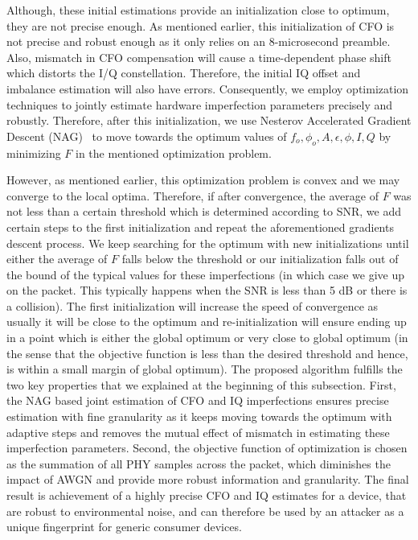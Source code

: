 Although, these initial estimations provide an initialization close to optimum, they are not precise enough. As mentioned earlier, this initialization of CFO is not precise and robust enough as it only relies on an 8-microsecond preamble. Also, mismatch in CFO compensation will cause a time-dependent phase shift which distorts the I/Q constellation. Therefore, the initial IQ offset and imbalance estimation will also have errors. Consequently, we employ optimization techniques to jointly estimate hardware imperfection parameters precisely and robustly. Therefore, after this initialization, we use Nesterov Accelerated Gradient Descent (NAG)~\cite{?} to move towards the optimum values of $f_o,\phi_o,A,\epsilon,\phi,I,Q$ by minimizing $F$ in the mentioned optimization problem.

However, as mentioned earlier, this optimization problem is convex and we may converge to the local optima. Therefore, if after convergence, the average of $F$ was not less than a certain threshold which is determined according to SNR, we add certain steps to the first initialization and repeat the aforementioned gradients descent process. We keep searching for the optimum with new initializations until either the average of $F$ falls below the threshold or our initialization falls out of the bound of the typical values for these imperfections (in which case we give up on the packet. This typically happens when the SNR is less than 5 dB or there is a collision). The first initialization will increase the speed of convergence as usually it will be close to the optimum and re-initialization will ensure ending up in a point which is either the global optimum or very close to global optimum (in the sense that the objective function is less than the desired threshold and hence, is within a small margin of global optimum). The proposed algorithm fulfills the two key properties that we explained at the beginning of this subsection. First, the NAG based joint estimation of CFO and IQ imperfections ensures precise estimation with fine granularity as it keeps moving towards the optimum with adaptive steps and removes the mutual effect of mismatch in estimating these imperfection parameters. Second, the objective function of optimization is chosen as the summation of all PHY samples across the packet, which diminishes the impact of AWGN and provide more robust information and granularity. The final result is achievement of a highly precise CFO and IQ estimates for a device, that are robust to environmental noise, and can therefore be used by an attacker as a unique fingerprint for generic consumer devices.


